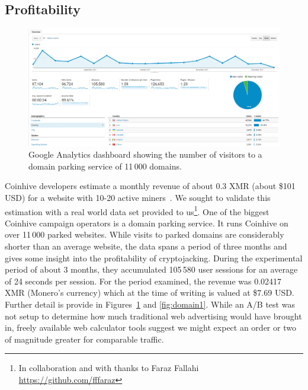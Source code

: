 \subsection{Profitability}
\label{profitabilitexperiment}

\begin{figure}[t]
\centering
\includegraphics[width=\linewidth]{figures/experiment_analytics_results.png}
\caption{Google Analytics dashboard showing the number of visitors to a domain parking service of 11\,000 domains.}\label{fig:domain2}
\end{figure}


Coinhive developers estimate a monthly revenue of about 0.3 XMR (about \$101 USD) for a website with 10-20 active miners~\cite{coinhive}. We sought to validate this estimation with a real world data set provided to us\footnote{In collaboration and with thanks to Faraz Fallahi \url{https://github.com/fffaraz}}. One of the biggest Coinhive campaign operators is a domain parking service. It runs Coinhive on over 11\,000 parked websites. While visits to parked domains are considerably shorter than an average website, the data spans a period of three months and gives some insight into the profitability of cryptojacking. During the experimental period of about 3 months, they accumulated 105\,580 user sessions for an average of 24 seconds per session. For the period examined, the revenue was 0.02417 XMR (Monero's currency) which at the time of writing is valued at \$7.69 USD. Further detail is provide in Figures~\ref{fig:domain2} and \ref{fig:domain1}. While an A/B test was not setup to determine how much traditional web advertising would have brought in, freely available web calculator tools suggest we might expect an order or two of magnitude greater for comparable traffic. 


